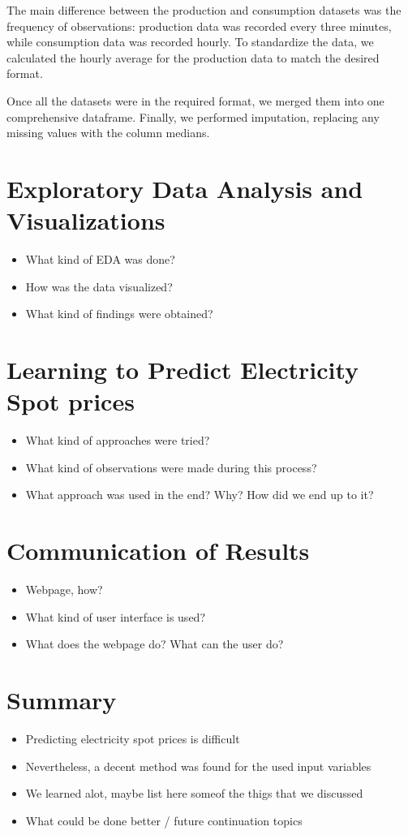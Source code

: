 \documentclass{article}
\numberwithin{equation}{section}
\begin{document}
\begin{itemize}
The main difference between the production and consumption datasets was the frequency of observations: production data was recorded every three minutes, while consumption data was recorded hourly. To standardize the data, we calculated the hourly average for the production data to match the desired format.

Once all the datasets were in the required format, we merged them into one comprehensive dataframe. Finally, we performed imputation, replacing any missing values with the column medians.
\end{itemize}

\section{Exploratory Data Analysis and Visualizations}
\begin{itemize}
	\item What kind of EDA was done?
	\item How was the data visualized?
	\item What kind of findings were obtained?
\end{itemize}

\section{Learning to Predict Electricity Spot prices}
\begin{itemize}
	\item What kind of approaches were tried?
	\item What kind of observations were made during this process?
	\item What approach was used in the end? Why? How did we end up to it?
\end{itemize}

\section{Communication of Results}
\begin{itemize}
	\item Webpage, how?
	\item What kind of user interface is used?
	\item What does the webpage do? What can the user do?
\end{itemize}

\section{Summary}
\begin{itemize}
	\item Predicting electricity spot prices is difficult
	\item Nevertheless, a decent method was found for the used input variables
	\item We learned alot, maybe list here someof the thigs that we discussed
	\item What could be done better / future continuation topics
\end{itemize}
\end{document}
